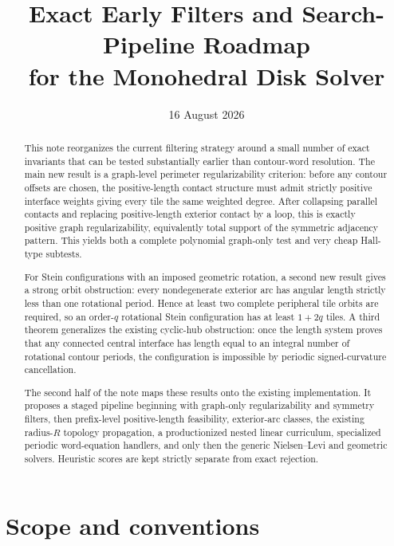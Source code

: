 \documentclass[11pt]{article}
\title{\textbf{Exact Early Filters and Search-Pipeline Roadmap\\for the Monohedral Disk Solver}}
\author{}
\date{16 August 2026}
\theoremstyle{definition}
\theoremstyle{remark}
\begin{document}
\maketitle
\vspace{-1.5em}

\begin{abstract}
This note reorganizes the current filtering strategy around a small number of exact invariants that can be tested substantially earlier than contour-word resolution.  The main new result is a graph-level perimeter regularizability criterion: before any contour offsets are chosen, the positive-length contact structure must admit strictly positive interface weights giving every tile the same weighted degree.  After collapsing parallel contacts and replacing positive-length exterior contact by a loop, this is exactly positive graph regularizability, equivalently total support of the symmetric adjacency pattern.  This yields both a complete polynomial graph-only test and very cheap Hall-type subtests.

For Stein configurations with an imposed geometric rotation, a second new result gives a strong orbit obstruction: every nondegenerate exterior arc has angular length strictly less than one rotational period.  Hence at least two complete peripheral tile orbits are required, so an order-$q$ rotational Stein configuration has at least $1+2q$ tiles.  A third theorem generalizes the existing cyclic-hub obstruction: once the length system proves that any connected central interface has length equal to an integral number of rotational contour periods, the configuration is impossible by periodic signed-curvature cancellation.

The second half of the note maps these results onto the existing implementation.  It proposes a staged pipeline beginning with graph-only regularizability and symmetry filters, then prefix-level positive-length feasibility, exterior-arc classes, the existing radius-$R$ topology propagation, a productionized nested linear curriculum, specialized periodic word-equation handlers, and only then the generic Nielsen--Levi and geometric solvers.  Heuristic scores are kept strictly separate from exact rejection.
\end{abstract}

\tableofcontents

\section{Scope and conventions}
\end{document}
